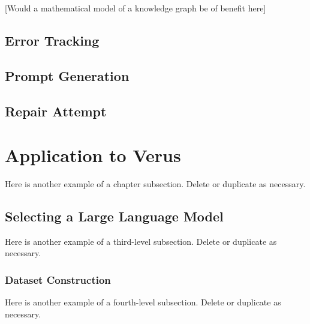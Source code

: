 [Would a mathematical model of a knowledge graph be of benefit here]

\subsection{Error Tracking}

\subsection{Prompt Generation}

\subsection{Repair Attempt}

\section{Application to Verus}
Here is another example of a chapter subsection. Delete or duplicate as necessary.

\subsection{Selecting a Large Language Model}
Here is another example of a third-level subsection. Delete or duplicate as necessary.

\subsubsection{Dataset Construction}
Here is another example of a fourth-level subsection. Delete or duplicate as necessary.
